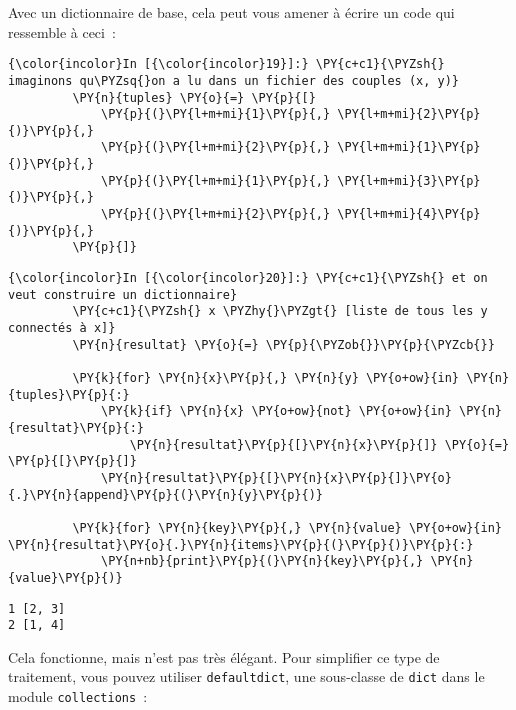 Avec un dictionnaire de base, cela peut vous amener à écrire un code qui
ressemble à ceci~:

    \begin{Verbatim}[commandchars=\\\{\}]
{\color{incolor}In [{\color{incolor}19}]:} \PY{c+c1}{\PYZsh{} imaginons qu\PYZsq{}on a lu dans un fichier des couples (x, y)}
         \PY{n}{tuples} \PY{o}{=} \PY{p}{[}
             \PY{p}{(}\PY{l+m+mi}{1}\PY{p}{,} \PY{l+m+mi}{2}\PY{p}{)}\PY{p}{,}
             \PY{p}{(}\PY{l+m+mi}{2}\PY{p}{,} \PY{l+m+mi}{1}\PY{p}{)}\PY{p}{,}
             \PY{p}{(}\PY{l+m+mi}{1}\PY{p}{,} \PY{l+m+mi}{3}\PY{p}{)}\PY{p}{,}
             \PY{p}{(}\PY{l+m+mi}{2}\PY{p}{,} \PY{l+m+mi}{4}\PY{p}{)}\PY{p}{,}
         \PY{p}{]}
\end{Verbatim}


    \begin{Verbatim}[commandchars=\\\{\}]
{\color{incolor}In [{\color{incolor}20}]:} \PY{c+c1}{\PYZsh{} et on veut construire un dictionnaire}
         \PY{c+c1}{\PYZsh{} x \PYZhy{}\PYZgt{} [liste de tous les y connectés à x]}
         \PY{n}{resultat} \PY{o}{=} \PY{p}{\PYZob{}}\PY{p}{\PYZcb{}}
         
         \PY{k}{for} \PY{n}{x}\PY{p}{,} \PY{n}{y} \PY{o+ow}{in} \PY{n}{tuples}\PY{p}{:}
             \PY{k}{if} \PY{n}{x} \PY{o+ow}{not} \PY{o+ow}{in} \PY{n}{resultat}\PY{p}{:}
                 \PY{n}{resultat}\PY{p}{[}\PY{n}{x}\PY{p}{]} \PY{o}{=} \PY{p}{[}\PY{p}{]}
             \PY{n}{resultat}\PY{p}{[}\PY{n}{x}\PY{p}{]}\PY{o}{.}\PY{n}{append}\PY{p}{(}\PY{n}{y}\PY{p}{)}
         
         \PY{k}{for} \PY{n}{key}\PY{p}{,} \PY{n}{value} \PY{o+ow}{in} \PY{n}{resultat}\PY{o}{.}\PY{n}{items}\PY{p}{(}\PY{p}{)}\PY{p}{:}
             \PY{n+nb}{print}\PY{p}{(}\PY{n}{key}\PY{p}{,} \PY{n}{value}\PY{p}{)}
\end{Verbatim}


    \begin{Verbatim}[commandchars=\\\{\}]
1 [2, 3]
2 [1, 4]

    \end{Verbatim}

    Cela fonctionne, mais n'est pas très élégant. Pour simplifier ce type de
traitement, vous pouvez utiliser \texttt{defaultdict}, une sous-classe
de \texttt{dict} dans le module \texttt{collections}~:

